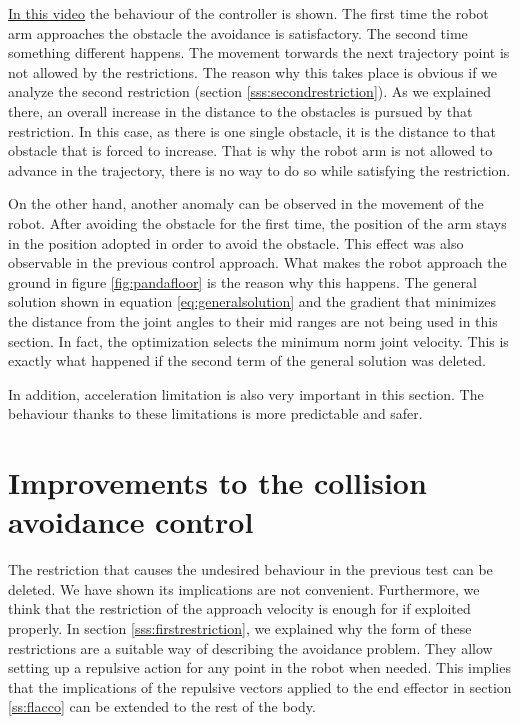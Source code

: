 \href{https://www.youtube.com/watch?v=eJjqcIr-7Qw&list=PLnhdDYfKdsgimnQTQO-bmtKj-KRdbvGgS&index=7&t=0s}{In this video} the behaviour of the controller is shown. The first time the robot arm approaches the obstacle the avoidance is satisfactory. The second time something different happens. The movement torwards the next trajectory point is not allowed by the restrictions. The reason why this takes place is obvious if we analyze the second restriction (section \ref{sss:secondrestriction}). As we explained there, an overall increase in the distance to the obstacles is pursued by that restriction. In this case, as there is one single obstacle, it is the distance to that obstacle that is forced to increase. That is why the robot arm is not allowed to advance in the trajectory, there is no way to do so while satisfying the restriction.

On the other hand, another anomaly can be observed in the movement of the robot. After avoiding the obstacle for the first time, the position of the arm stays in the position adopted in order to avoid the obstacle. This effect was also observable in the previous control approach. What makes the robot approach the ground in figure \ref{fig:pandafloor} is the reason why this happens. The general solution shown in equation \ref{eq:generalsolution} and the gradient that minimizes the distance from the joint angles to their mid ranges are not being used in this section. In fact, the optimization selects the minimum norm joint velocity. This is exactly what happened if the second term of the general solution was deleted.

In addition, acceleration limitation is also very important in this section. The behaviour thanks to these limitations is more predictable and safer.

\section{Improvements to the collision avoidance control}

The restriction that causes the undesired behaviour in the previous test can be deleted. We have shown its implications are not convenient. Furthermore, we think that the restriction of the approach velocity is enough for if exploited properly. In section \ref{sss:firstrestriction}, we explained why the form of these restrictions are a suitable way of describing the avoidance problem. They allow setting up a repulsive action for any point in the robot when needed. This implies that the implications of the repulsive vectors applied to the end effector in section \ref{ss:flacco} can be extended to the rest of the body.

